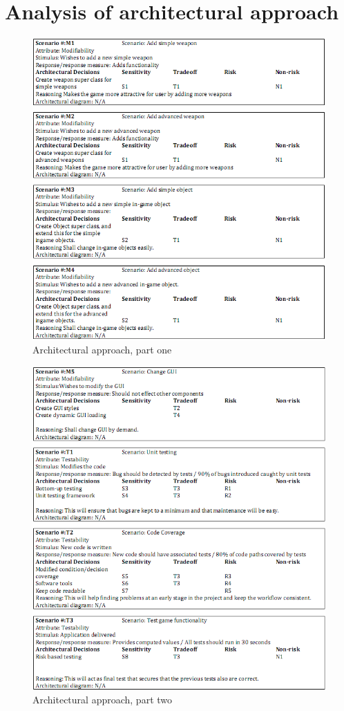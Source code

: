 \section{Analysis of architectural approach}

\begin{figure}[H]
\includegraphics[width=1\textwidth]{Images/approach}
\caption{Architectural approach, part one}
\end{figure}

\begin{figure}[H]
\includegraphics[width=1\textwidth]{Images/approach2}
\caption{Architectural approach, part two}
\end{figure}
